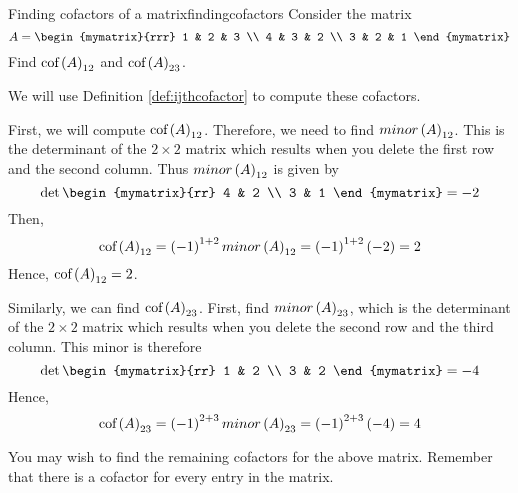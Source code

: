 \begin{example}{Finding cofactors of a matrix}{findingcofactors}
Consider the matrix
\begin{equation*}
A=\begin{mymatrix}{rrr}
1 & 2 & 3 \\
4 & 3 & 2 \\
3 & 2 & 1
\end{mymatrix} 
\end{equation*}
Find $\mbox{cof}\left(A\right) _{12}$ and $\mbox{cof}\left(A\right) _{23}$.
\end{example}

\begin{solution} We will use Definition \ref{def:ijthcofactor} to compute these cofactors. 

First, we will compute $\mbox{cof}\left(A\right) _{12}$. 
Therefore, we need to find $minor\left(A\right)_{12}$. This is the determinant of the $2\times 2$ matrix
which results when you delete the first row and the second column. Thus $minor\left(A\right)_{12}$ is given by 
\begin{equation*}
\det \begin{mymatrix}{rr}
4 & 2 \\
3 & 1
\end{mymatrix} = -2
\end{equation*}
Then,
\begin{equation*}
\mbox{cof}\left(A\right) _{12}=\left(-1\right) ^{1+2} minor\left(A\right)_{12} =\left(-1\right) ^{1+2}\left(-2\right) =2
\end{equation*}
Hence, $\mbox{cof}\left(A\right) _{12}=2$.

Similarly, we can find $\mbox{cof}\left(A\right) _{23}$. First, find $minor\left(A\right)_{23}$, which is the determinant of the $2\times 2$ matrix
which results when you delete the second row and the third column. This
minor is therefore
\begin{equation*}
\det \begin{mymatrix}{rr}
1 & 2 \\
3 & 2
\end{mymatrix} = -4
\end{equation*}
Hence,
\begin{equation*}
\mbox{cof}\left(A\right) _{23}=\left(-1\right) ^{2+3} minor\left(A\right)_{23} =\left(-1\right) ^{2+3}\left(-4\right) =4
\end{equation*}
\end{solution}

You may wish to find the remaining cofactors for the above matrix. Remember that there is a cofactor 
for every entry in the matrix.  

